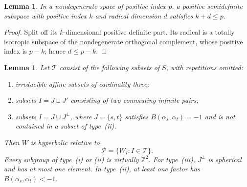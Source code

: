 \documentclass[11pt,reqno]{amsart}
\theoremstyle{plain}
\newtheorem{lemma}[theorem]{Lemma}
\theoremstyle{definition}
\theoremstyle{remark}
\numberwithin{equation}{section}
\begin{document}
\begin{lemma}\label{lem:positive-index-bound}
In a nondegenerate space of positive index $p$, a positive semidefinite subspace with positive index $k$ and radical dimension $d$ satisfies $k+d\leq p$.
\end{lemma}
\begin{proof}
Split off its $k$-dimensional positive definite part. Its radical is a totally isotropic subspace of the nondegenerate orthogonal complement, whose positive index is $p-k$; hence $d\leq p-k$.
\end{proof}

\begin{lemma}\label{lem:32-peripherals}
Let $\mathcal T$ consist of the following subsets of $S$,
with repetitions omitted:
\begin{enumerate}[label=(\roman*)]
    \item irreducible affine subsets of cardinality three;
    \item subsets $I=J\sqcup J'$ consisting of two commuting
    infinite pairs;
    \item subsets $I=J\cup J^\perp$, where
    $J=\{s,t\}$ satisfies $B(\alpha_s,\alpha_t)=-1$
    and is not contained in a subset of type~\textup{(ii)}.
\end{enumerate}
Then $W$ is hyperbolic relative to
\[
    \mathcal P=\{W_I:I\in\mathcal T\}.
\]
Every subgroup of type~\textup{(i)} or \textup{(ii)}
is virtually $\mathbb Z^2$.
For type~\textup{(iii)}, $J^\perp$ is spherical and has
at most one element.
In type~\textup{(ii)}, at least one factor has
$B(\alpha_s,\alpha_t)<-1$.
\end{lemma}
\end{document}
